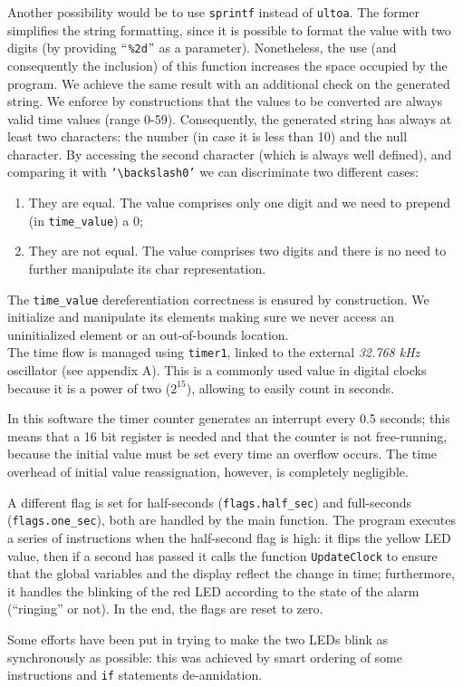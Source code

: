 Another possibility would be to use \texttt{sprintf} instead of \texttt{ultoa}. The former simplifies the string formatting, since it is possible to format the value with two digits (by providing \texttt{$``$\%2d$"$} as a parameter). Nonetheless, the use (and consequently the inclusion) of this function increases the space occupied by the program. We achieve the same result with an additional check on the generated string. We enforce by constructions that the values to be converted are always valid time values (range 0-59). Consequently, the generated string has always at least two characters: the number (in case it is less than 10) and the null character. By accessing the second character (which is always well defined), and comparing it with \texttt{`$\backslash$0'} we can discriminate two different cases:
\begin{enumerate}
	\item They are equal. The value comprises only one digit and we need to prepend (in \texttt{time\_value}) a $0$;
	\item They are not equal. The value comprises two digits and there is no need to further manipulate its char representation.
\end{enumerate}
The \texttt{time\_value} dereferentiation correctness is ensured by construction. We initialize and manipulate its elements making sure we never access an uninitialized element or an out-of-bounds location.\\

The time flow is managed using \texttt{timer1}, linked to the external \textit{32.768 kHz} oscillator (see appendix A). This is a commonly used value in digital clocks because it is a power of two ($2^{15}$), allowing to easily count in seconds.

In this software the timer counter generates an interrupt every 0.5 seconds; this means that a 16 bit register is needed and that the counter is not free-running, because the initial value must be set every time an overflow occurs. The time overhead of initial value reassignation, however, is completely negligible.

A different flag is set for half-seconds (\texttt{flags.half\_sec}) and full-seconds (\texttt{flags.one\_sec}), both are handled by the main function.
The program executes a series of instructions when the half-second flag is high: it flips the yellow LED value, then if a second has passed it calls the function \texttt{UpdateClock} to ensure that the global variables and the display reflect the change in time; furthermore, it handles the blinking of the red LED according to the state of the alarm (``ringing'' or not). In the end, the flags are reset to zero.

Some efforts have been put in trying to make the two LEDs blink as synchronously as possible: this was achieved by smart ordering of some instructions and \texttt{if} statements de-annidation.